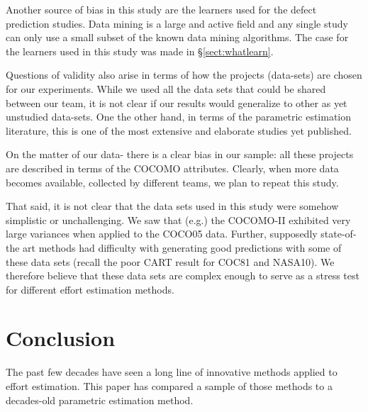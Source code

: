 \documentclass{sig-alternate}
\newcommand{\tion}[1]{\S\ref{sect:#1}}
\begin{document}



Another source of bias in this study
are the learners used for the defect prediction
studies. Data mining is a large and active field and
any single study can only use a small subset of the
known data mining algorithms. The case for the
learners used in this study was made in \tion{whatlearn}.

Questions of validity also arise in terms of how the
projects (data-sets) are chosen for our experiments.
While we used all the data sets that could be shared
between our team, it is not clear if our results
would generalize to other as yet unstudied
data-sets. One the other hand, in terms of the
parametric estimation literature, this is one of the most extensive
and elaborate studies yet published.

On the matter of our data- there is a clear bias in
our sample: all these projects are described in terms of
the COCOMO attributes.  Clearly, when more data
becomes available, collected by different teams, we
plan to repeat this study.%


That said, it is not clear that the data sets used in this study
were   somehow simplistic or unchallenging. We saw
that (e.g.) the COCOMO-II exhibited very large
variances when applied to the COCO05 data. Further,
supposedly state-of-the art methods had difficulty
with generating good predictions with some of these
data sets (recall the poor CART result for COC81 and
NASA10).  We therefore believe that these data sets
are complex enough to serve as a stress test for
different effort estimation methods.


\section{Conclusion}
The past few decades have seen a long line of innovative  methods
applied to effort estimation. This paper has compared a sample of those methods
to a decades-old parametric estimation method. 
\end{document}
